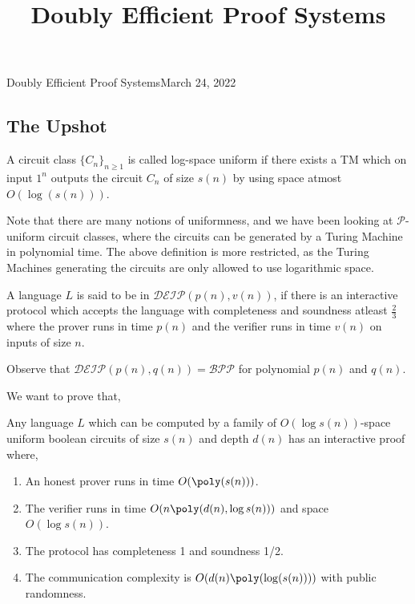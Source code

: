 
\newcommand{\F}{\mathcal{F}}
\newcommand{\fH}{\mathcal{H}}


\title{Doubly Efficient Proof Systems}


\begin{lecture}{9}{Doubly Efficient Proof Systems}{March 24, 2022}\label{lec:09}
\maketitle


\subsection*{The Upshot}%


\begin{definition}\label{def:logspaceuniform}
	A circuit class $\{C_n\}_{n \geq 1}$ is called log-space uniform if there exists a TM which on input $1^n$ outputs the circuit $C_n$ of size $s(n)$ by using space atmost $O(\log(s(n)))$.
\end{definition}


Note that there are many notions of uniformness, and we have been looking at $\mathcal{P}$-uniform circuit classes, where the circuits can be generated by a Turing Machine in polynomial time. The above definition is more restricted, as the Turing Machines generating the circuits are only allowed to use logarithmic space. 

\begin{definition}
	A language $L$ is said to be in $\mathcal{DEIP}(p(n), v(n))$, if there is an interactive protocol which accepts the language with completeness and soundness atleast $\frac23$ where the prover runs in time $p(n)$ and the verifier runs in time $v(n)$ on inputs of size $n$.
\end{definition}

Observe that $\mathcal{DEIP}(p(n), q(n)) = \mathcal{BPP}$ for polynomial $p(n)$ and $q(n)$. 

We want to prove that,

\begin{theorem}\label{thm:main}
	Any language $L$ which can be computed by a family of $O(\log s(n))$-space uniform boolean circuits of size $s(n)$ and depth $d(n)$ has an interactive proof where,
	
	\begin{enumerate}
		\item An honest prover runs in time $O(\poly(s(n)))$. 
		\item The verifier runs in time $O(n \poly(d(n), \log s(n)))$ and space $O(\log s(n))$.
		\item The protocol has completeness 1 and soundness 1/2. 
		\item The communication complexity is $O(d(n)\poly(\log(s(n))))$ with public randomness. 
	\end{enumerate}
\end{theorem}



\end{lecture}
